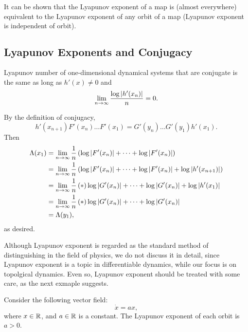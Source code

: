 \documentclass[12pt,twoside,draft]{book}
\begin{document}
It can be shown that the Lyapunov exponent of a map is (almost everywhere) equivalent to the Lyapunov exponent of any orbit of a map (Lyapunov exponent is independent of orbit).

\subsection{Lyapunov Exponents and Conjugacy}
Lyapunov number of one-dimensional dynamical systems that are conjugate is the same
as long as $h'(x) \neq 0$ and
\begin{equation*}
  \lim\limits_{n\to \infty} \frac{\log\left | h'(x_n) \right |}{n} = 0.
\end{equation*}

By the definition of conjugacy,
\begin{equation*}
  h'(x_{n+1})F'(x_n)\ldots F'(x_1) = G'(y_n)\ldots G'(y_1)h'(x_1).
\end{equation*}
Then 
\begin{align*}
  \Lambda(x_1) &= \lim\limits_{n\to \infty} \frac{1}{n}\left ( \log\left | F'(x_n) \right | + \cdots + \log\left | F'(x_n) \right |  \right ) \\
  &= \lim\limits_{n\to \infty} \frac{1}{n}\left(\log\left | F'(x_n) \right | + \cdots + \log\left | F'(x_n) \right | + \log\left | h'(x_{n+1}) \right |\right) \\
  &= \lim\limits_{n\to \infty} \frac{1}{n} \left ( * \right ){ \log\left | G'(x_n) \right | + \cdots + \log\left | G'(x_n) \right | + \log\left | h'(x_1) \right | } \\
  &= \lim\limits_{n\to \infty} \frac{1}{n} \left ( * \right ){ \log\left | G'(x_n) \right | + \cdots + \log\left | G'(x_n) \right | } \\
  &= \Lambda(y_1),
\end{align*} 
as desired.

Although Lyapunov exponent is regarded as the standard method of distinguishing in the field of physics, we do not discuss it in detail, since Lyapunov exponent is a topic in differentiable dynamics, while our focus is on topolgical dynamics.
Even so, Lyapunov exponent should be treated with some care, as the next exmaple suggests.
\begin{example}
  \citep{wiggins}
  Consider the following vector field:
  \begin{equation*}
    \dot{x} = ax,
  \end{equation*}
  where $x \in \mathbb{R}$, and $a \in \mathbb{R}$ is a constant.
  The Lyapunov exponent of each orbit is $a > 0$.
\end{example}



\end{document}
